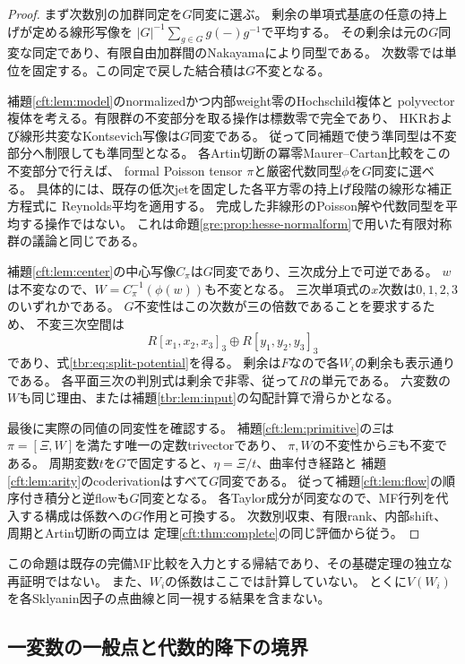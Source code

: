 \begin{proof}
まず次数別の加群同定を$G$同変に選ぶ。
剰余の単項式基底の任意の持上げが定める線形写像を
$|G|^{-1}\sum_{g\in G}g(-)g^{-1}$で平均する。
その剰余は元の$G$同変な同定であり、有限自由加群間のNakayamaにより同型である。
次数零では単位を固定する。この同定で戻した結合積は$G$不変となる。

補題\ref{cft:lem:model}のnormalizedかつ内部weight零のHochschild複体と
polyvector複体を考える。有限群の不変部分を取る操作は標数零で完全であり、
HKRおよび線形共変なKontsevich写像は$G$同変である。
従って同補題で使う準同型は不変部分へ制限しても準同型となる。
各Artin切断の冪零Maurer--Cartan比較をこの不変部分で行えば、
formal Poisson tensor $\pi$と厳密代数同型$\phi$を$G$同変に選べる。
具体的には、既存の低次jetを固定した各平方零の持上げ段階の線形な補正方程式に
Reynolds平均を適用する。
完成した非線形のPoisson解や代数同型を平均する操作ではない。
これは命題\ref{gre:prop:hesse-normalform}で用いた有限対称群の議論と同じである。

補題\ref{cft:lem:center}の中心写像$C_\pi$は$G$同変であり、三次成分上で可逆である。
$w$は不変なので、$W=C_\pi^{-1}(\phi(w))$も不変となる。
三次単項式の$x$次数は$0,1,2,3$のいずれかである。
$G$不変性はこの次数が三の倍数であることを要求するため、
不変三次空間は
\[
 R[x_1,x_2,x_3]_3\oplus R[y_1,y_2,y_3]_3
\]
であり、式\eqref{tbr:eq:split-potential}を得る。
剰余は$F$なので各$W_i$の剰余も表示通りである。
各平面三次の判別式は剰余で非零、従って$R$の単元である。
六変数の$W$も同じ理由、または補題\ref{tbr:lem:input}の勾配計算で滑らかとなる。

最後に実際の同値の同変性を確認する。
補題\ref{cft:lem:primitive}の$\Xi$は$\pi=[\Xi,W]$を満たす唯一の定数trivectorであり、
$\pi,W$の不変性から$\Xi$も不変である。
周期変数$t$を$G$で固定すると、$\eta=\Xi/t$、曲率付き経路と
補題\ref{cft:lem:arity}のcoderivationはすべて$G$同変である。
従って補題\ref{cft:lem:flow}の順序付き積分と逆flowも$G$同変となる。
各Taylor成分が同変なので、MF行列を代入する構成は係数への$G$作用と可換する。
次数別収束、有限rank、内部shift、周期とArtin切断の両立は
定理\ref{cft:thm:complete}の同じ評価から従う。
\end{proof}

この命題は既存の完備MF比較を入力とする帰結であり、その基礎定理の独立な再証明ではない。
また、$W_i$の係数はここでは計算していない。
とくに$V(W_i)$を各Sklyanin因子の点曲線と同一視する結果を含まない。

\subsection{一変数の一般点と代数的降下の境界}

